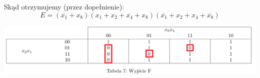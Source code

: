\documentclass{article}
\begin{document}
            \FloatBarrier
            Skąd otrzymujemy (przez dopełnienie):
            $$E = (\overline{x_1}+x_8)(x_1+x_2+\overline{x_4}+x_8)(\overline{x_1}+x_2+x_4+\overline{x_8})$$
            \begin{center}
                \includegraphics[width=18cm]{reports/img/Z1C_tab_7.png}\\
            \end{center}
                        
                         
                        
\end{document}
